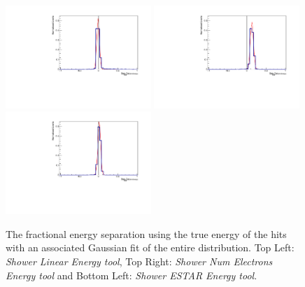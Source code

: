 \begin{figure}[h!]
    \centering
    \includegraphics[width = 0.49\textwidth]{figures-chap4/hist_gauss_fit/linear_hit_only.pdf}
    \includegraphics[width = 0.49\textwidth]{figures-chap4/hist_gauss_fit/oldmethod_hit_only.pdf}
    \includegraphics[width = 0.49\textwidth]{figures-chap4/hist_gauss_fit/ESTAR_hit_only.pdf}
    \captionsetup{width=0.45\textwidth}
    \parbox[b]{0.49\textwidth}%
  {
    \caption[Fractional energy separation using the true energy of the hits with a Gaussian fitted to the distribution.]
    {The fractional energy separation using the true energy of the hits with an associated Gaussian fit of the entire distribution. Top Left: \textit{Shower Linear Energy tool}, Top Right: \textit{Shower Num Electrons Energy tool} and Bottom Left: \textit{Shower ESTAR Energy tool}. \\}
    \label{fig:gauss_fit_hit_level}}
\end{figure}

